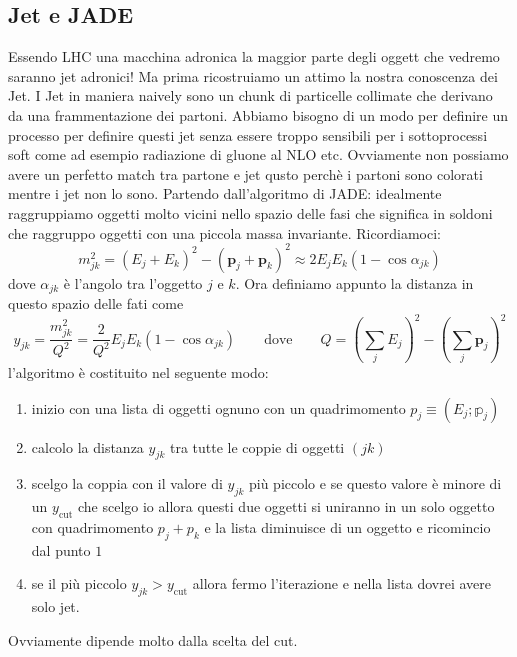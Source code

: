 \documentclass[11pt]{article}
\begin{document}
\subsection{Jet e JADE}
Essendo LHC una macchina adronica la maggior parte degli oggett che vedremo saranno jet adronici! Ma prima ricostruiamo un attimo la nostra conoscenza dei Jet. I Jet in maniera naively sono un chunk di particelle collimate che derivano da una frammentazione dei partoni. Abbiamo bisogno di un modo per definire un processo per definire questi jet senza essere troppo sensibili per i sottoprocessi soft come ad esempio radiazione di gluone al NLO etc. Ovviamente non possiamo avere un perfetto match tra partone e jet qusto perchè i partoni sono colorati mentre i jet non lo sono. Partendo dall'algoritmo di JADE: idealmente raggruppiamo oggetti molto vicini nello spazio delle fasi che significa in soldoni che raggruppo oggetti con una piccola massa invariante. Ricordiamoci:
\begin{equation}
    m_{jk}^2=(E_j+E_k)^2-(\mathbf{p}_j+\mathbf{p}_k)^2\approx2E_jE_k(1-\cos\alpha_{jk})
\end{equation}
dove $\alpha_{jk}$ è l'angolo tra l'oggetto $j$ e $k$. Ora definiamo appunto la distanza in questo spazio delle fati come
\begin{equation}
    y_{jk}=\frac{m_{jk}^2}{Q^2}=\frac{2}{Q^2}E_jE_k(1-\cos\alpha_{jk}) \qquad \text{dove} \qquad Q=\left(\sum_jE_j\right)^2- \left(\sum_j\mathbf{p}_j\right)^2
\end{equation}
l'algoritmo è costituito nel seguente modo:
\begin{enumerate}
    \item inizio con una lista di oggetti ognuno con un quadrimomento $p_j\equiv(E_j;\mathbb{p}_j)$
    \item calcolo la distanza $y_{jk}$ tra tutte le coppie di oggetti $(jk)$
    \item scelgo la coppia con il valore di $y_{jk}$ più piccolo e se questo valore è minore di un $y_\text{cut}$ che scelgo io allora questi due oggetti si uniranno in un solo oggetto con quadrimomento $p_j+p_k$ e la lista diminuisce di un oggetto e ricomincio dal punto $1$
    \item se il più piccolo $y_{jk}>y_\text{cut}$ allora fermo l'iterazione e nella lista dovrei avere solo jet. 
\end{enumerate}
Ovviamente dipende molto dalla scelta del cut.
\end{document}
